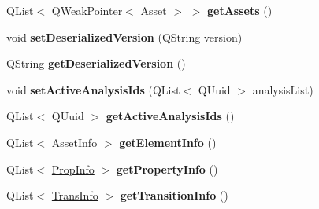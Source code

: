 \begin{DoxyCompactItemize}
\item 
\hypertarget{class_picto_1_1_design_config_a031dc5cb3826114a2d589234ac45d6cf}{Q\-List$<$ Q\-Weak\-Pointer$<$ \hyperlink{class_picto_1_1_asset}{Asset} $>$ $>$ {\bfseries get\-Assets} ()}\label{class_picto_1_1_design_config_a031dc5cb3826114a2d589234ac45d6cf}

\item 
\hypertarget{class_picto_1_1_design_config_ad77decc05c2033ef2f0eb049f3d415ba}{void {\bfseries set\-Deserialized\-Version} (Q\-String version)}\label{class_picto_1_1_design_config_ad77decc05c2033ef2f0eb049f3d415ba}

\item 
\hypertarget{class_picto_1_1_design_config_ae64af0f48e79e6b212c7a9481e71d9a5}{Q\-String {\bfseries get\-Deserialized\-Version} ()}\label{class_picto_1_1_design_config_ae64af0f48e79e6b212c7a9481e71d9a5}

\item 
\hypertarget{class_picto_1_1_design_config_a92e25c6bfd259ff5f1c0dc1c5e53e0cd}{void {\bfseries set\-Active\-Analysis\-Ids} (Q\-List$<$ Q\-Uuid $>$ analysis\-List)}\label{class_picto_1_1_design_config_a92e25c6bfd259ff5f1c0dc1c5e53e0cd}

\item 
\hypertarget{class_picto_1_1_design_config_aa312b76386d7ba367f7eecc99aff66a1}{Q\-List$<$ Q\-Uuid $>$ {\bfseries get\-Active\-Analysis\-Ids} ()}\label{class_picto_1_1_design_config_aa312b76386d7ba367f7eecc99aff66a1}

\item 
\hypertarget{class_picto_1_1_design_config_a453d91273767b42fb8671b7b7d8c0f82}{Q\-List$<$ \hyperlink{struct_picto_1_1_asset_info}{Asset\-Info} $>$ {\bfseries get\-Element\-Info} ()}\label{class_picto_1_1_design_config_a453d91273767b42fb8671b7b7d8c0f82}

\item 
\hypertarget{class_picto_1_1_design_config_aafdbb68fe506e5aea507df0e68d0136a}{Q\-List$<$ \hyperlink{struct_picto_1_1_prop_info}{Prop\-Info} $>$ {\bfseries get\-Property\-Info} ()}\label{class_picto_1_1_design_config_aafdbb68fe506e5aea507df0e68d0136a}

\item 
\hypertarget{class_picto_1_1_design_config_ab01fa007c3942afb8eea42bad58a71e3}{Q\-List$<$ \hyperlink{struct_picto_1_1_trans_info}{Trans\-Info} $>$ {\bfseries get\-Transition\-Info} ()}\label{class_picto_1_1_design_config_ab01fa007c3942afb8eea42bad58a71e3}

\end{DoxyCompactItemize}
